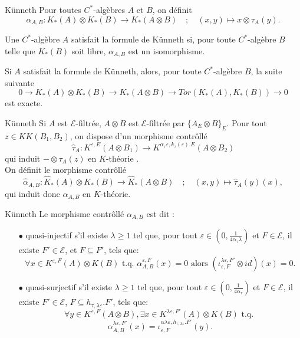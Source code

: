 \begin{frame}{Künneth}
Pour toutes $C^*$-algèbres $A$ et $B$, on définit
\[\alpha_{A,B} : K_*(A)\otimes K_*(B)\rightarrow K_*(A\otimes B) \quad ; \quad (x,y)\mapsto x\otimes   \tau_A(y).\]

\begin{definitionfr}
Une $C^*$-algèbre $A$ satisfait la formule de Künneth si, pour toute $C^*$-algèbre $B$ telle que $K_*(B)$ soit libre, $\alpha_{A,B}$ est un isomorphisme.
\end{definitionfr}

Si $A$ satisfait la formule de Künneth, alors, pour toute $C^*$-algèbre $B$, la suite suivante
\[0  \rightarrow K_*(A)\otimes K_*(B) \rightarrow K_*(A\otimes B)  \rightarrow Tor(K_*(A),K_*(B)) \rightarrow 0\]
est exacte.

\end{frame}

\begin{frame}{Künneth}
Si $A$ est $\mathcal E$-filtrée, $A\otimes B$ est $\mathcal E$-filtrée par $\{A_E\otimes B\}_E$. Pour tout $z \in KK(B_1,B_2)$, on dispose d'un morphisme contrôllé 
\[\hat \tau_A : K^{\varepsilon,E}(A\otimes B_1 ) \rightarrow K^{\alpha_\tau\varepsilon,k_\tau(\varepsilon).E}(A\otimes B_2)\]
qui induit $-\otimes \tau_A(z) $ en $K$-théorie \cite{OY2}.\\
\vspace{0.3 cm}
On définit le morphisme contrôllé  
\[\hat\alpha_{A,B} : \hat K_*(A)\otimes K_*(B)\rightarrow \hat K_*(A\otimes B) \quad ; \quad (x,y)\mapsto \hat\tau_A(y)(x),\]
qui induit donc $\alpha_{A,B}$ en $K$-théorie.\\
\end{frame}

\begin{frame}{Künneth}
Le morphisme contrôllé $\alpha_{A,B}$ est dit :
\begin{itemize}
 
\item[$\bullet$] quasi-injectif s'il existe $\lambda \geq 1$ tel que, pour tout $\varepsilon\in (0,\frac{1}{4\alpha_\tau \lambda})$ et $F\in\mathcal E$, il existe $F'\in\mathcal E$, et $F\subseteq F'$, tels que: 
\[\forall x\in K^{\varepsilon,F}(A)\otimes K(B)\text{ t.q. }\alpha_{A,B}^{\varepsilon,F}(x)=0 \text{ alors }(\iota_{\varepsilon,F}^{\lambda\varepsilon,F'}\otimes id) (x) = 0.\] 

\item[$\bullet$] quasi-surjectif s'il existe $\lambda \geq 1$ tel que, pour tout $\varepsilon \in (0,\frac{1}{4\alpha_\tau})$ et $F\in\mathcal E$, il existe $F'\in\mathcal E$, $F\subseteq h_{\tau,\lambda\varepsilon}.F'$, tels que:
\[ \forall y\in K^{\varepsilon,F}(A\otimes B), \exists x\in K^{\lambda\varepsilon, F'}(A)\otimes K(B) \text{ t.q. }\]
\[\alpha^{\lambda\varepsilon,F'}_{A,B}(x)=\iota_{\varepsilon,F}^{\alpha\lambda\varepsilon,h_{\tau, \lambda\varepsilon}.F'}(y).\] 

\end{itemize}
\end{frame}


